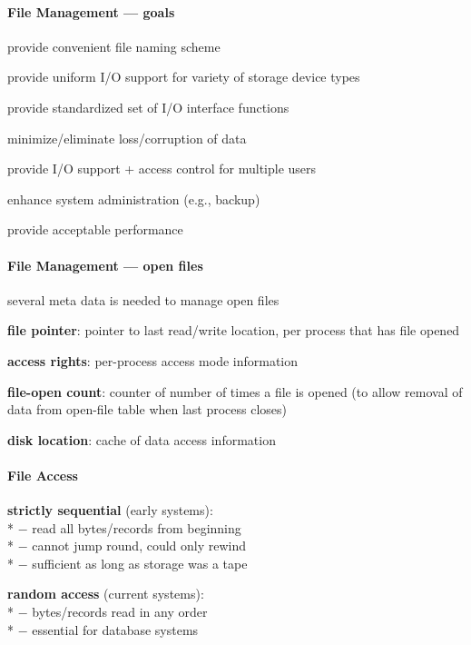 \paragraph{File Management --- goals}
\begin{items}
  \item provide convenient file naming scheme
  \item provide uniform I/O support for variety of storage device types
  \item provide standardized set of I/O interface functions
  \item minimize/eliminate loss/corruption of data
  \item provide I/O support + access control for multiple users
  \item enhance system administration (e.g., backup)
  \item provide acceptable performance
\end{items}

\paragraph{File Management --- open files}
\begin{items}
  \item several meta data is needed to manage open files
  \item \textbf{file pointer}: pointer to last read/write location, per process that has file opened
  \item \textbf{access rights}: per-process access mode information
  \item \textbf{file-open count}: counter of number of times a file is opened (to allow removal of data from open-file table when last process closes)
  \item \textbf{disk location}: cache of data access information
\end{items}

\paragraph{File Access}
\begin{items}
  \item \textbf{strictly sequential} (early systems): \\*
    $ - $ read all bytes/records from beginning \\*
    $ - $ cannot jump round, could only rewind \\*
    $ - $ sufficient as long as storage was a tape
  \item \textbf{random access} (current systems): \\*
    $ - $ bytes/records read in any order \\*
    $ - $ essential for database systems
\end{items}

